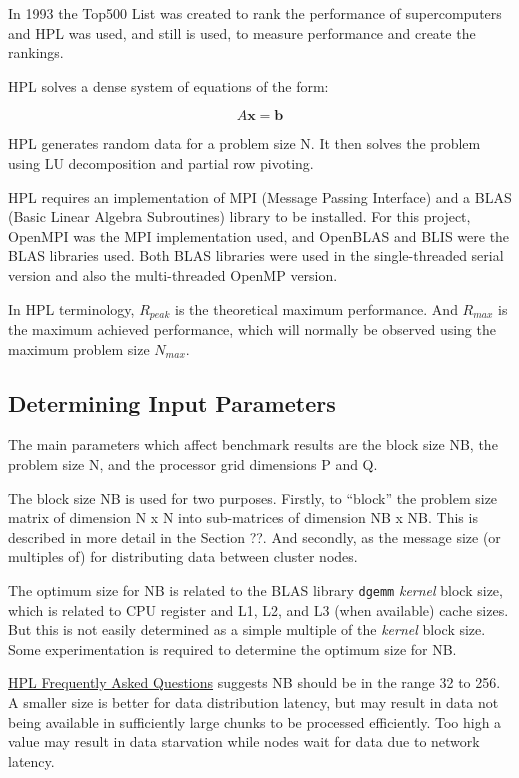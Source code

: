 \documentclass{report}
\begin{document}
In 1993 the Top500 List was created to rank the performance of supercomputers and HPL was used, and still is used, to measure performance and create the rankings.

HPL solves a dense system of equations of the form:

\[A\mathbf{x}=\mathbf{b}\]

HPL generates random data for a problem size N. It then solves the problem using LU decomposition and partial row pivoting.

HPL requires an implementation of MPI (Message Passing Interface) and a BLAS (Basic Linear Algebra Subroutines) library to be installed. For this project, OpenMPI was the MPI implementation used, and OpenBLAS and BLIS were the BLAS libraries used. Both BLAS libraries were used in the single-threaded serial version and also the multi-threaded OpenMP version.

In HPL terminology, $R_{peak}$ is the theoretical maximum performance. And $R_{max}$ is the maximum achieved performance, which will normally be observed using the maximum problem size $N_{max}$.


%
%
\subsection{Determining Input Parameters}

The main parameters which affect benchmark results are the block size NB, the problem size N, and the processor grid dimensions P and Q.

The block size NB is used for two purposes. Firstly, to ``block'' the problem size matrix of dimension N x N into sub-matrices of dimension NB x NB. This is described in more detail in the Section ??. And secondly, as the message size (or multiples of) for distributing data between cluster nodes.

The optimum size for NB is related to the BLAS library \verb|dgemm| \emph{kernel} block size, which is related to CPU register and L1, L2, and L3 (when available) cache sizes. But this is not easily determined as a simple multiple of the \emph{kernel} block size. Some experimentation is required to determine the optimum size for NB.

\href{https://www.netlib.org/benchmark/hpl/faqs.html}{HPL Frequently Asked Questions} suggests NB should be in the range 32 to 256. A smaller size is better for data distribution latency, but may result in data not being available in sufficiently large chunks to be processed efficiently. Too high a value may result in data starvation while nodes wait for data due to network latency.
\end{document}
